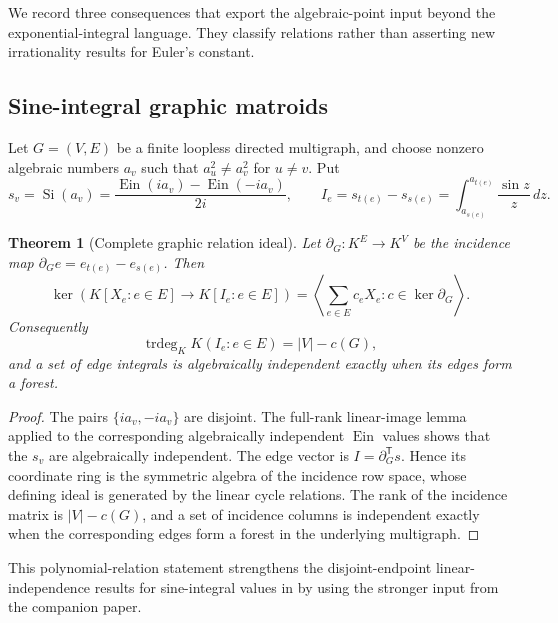 \documentclass[11pt]{article}
\theoremstyle{keio}
\newtheorem{theorem}{Theorem}[section]
\theoremstyle{definition}
\theoremstyle{remark}
\newcommand{\Ein}{\operatorname{Ein}}
\newcommand{\trdeg}{\operatorname{trdeg}}
\begin{document}
We record three consequences that export the algebraic-point input beyond
the exponential-integral language.  They classify relations rather than
asserting new irrationality results for Euler's constant.

\subsection*{Sine-integral graphic matroids}

Let \(G=(V,E)\) be a finite loopless directed multigraph, and choose nonzero algebraic numbers
\(a_v\) such that \(a_u^2\ne a_v^2\) for \(u\ne v\).  Put
\[
 s_v=\operatorname{Si}(a_v)
 =\frac{\Ein(ia_v)-\Ein(-ia_v)}{2i},
 \qquad
 I_e=s_{t(e)}-s_{s(e)}
 =\int_{a_{s(e)}}^{a_{t(e)}}\frac{\sin z}{z}\,dz.
\]

\begin{theorem}[Complete graphic relation ideal]
\label{thm:sine-graphic-ideal}
Let \(\partial_G:K^E\to K^V\) be the incidence map
\(\partial_Ge=e_{t(e)}-e_{s(e)}\).  Then
\begin{equation}\label{eq:sine-graphic-ideal}
 \boxed{\displaystyle
 \ker\!\left(K[X_e:e\in E]\longrightarrow K[I_e:e\in E]\right)
 =
 \left\langle\sum_{e\in E}c_eX_e:
 c\in\ker\partial_G\right\rangle.}
\end{equation}
Consequently
\begin{equation}\label{eq:sine-graphic-trdeg}
 \trdeg_KK(I_e:e\in E)=|V|-c(G),
\end{equation}
and a set of edge integrals is algebraically independent exactly when its
edges form a forest.
\end{theorem}

\begin{proof}
The pairs \(\{ia_v,-ia_v\}\) are disjoint.  The full-rank linear-image
lemma applied to the corresponding algebraically independent \(\Ein\)
values shows that the \(s_v\) are algebraically independent.  The edge
vector is \(I=\partial_G^{\mathsf T}s\).  Hence its coordinate ring is
the symmetric algebra of the incidence row space, whose defining ideal is
generated by the linear cycle relations.  The rank of the incidence matrix
is \(|V|-c(G)\), and a set of incidence columns is independent exactly when
the corresponding edges form a forest in the underlying multigraph.
\end{proof}

This polynomial-relation statement strengthens the disjoint-endpoint
linear-independence results for sine-integral values in
\cite{Delaygue2022} by using the stronger input from the companion paper.
\end{document}
